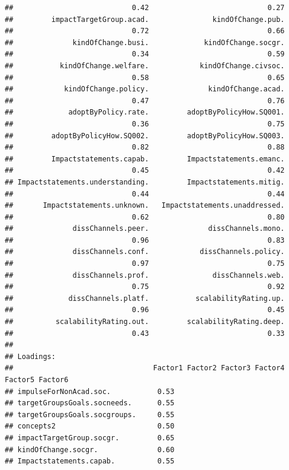 \documentclass[
]{article}
\begin{document}
\begin{verbatim}
##                            0.42                            0.27 
##         impactTargetGroup.acad.               kindOfChange.pub. 
##                            0.72                            0.66 
##              kindOfChange.busi.             kindOfChange.socgr. 
##                            0.34                            0.59 
##           kindOfChange.welfare.            kindOfChange.civsoc. 
##                            0.58                            0.65 
##            kindOfChange.policy.              kindOfChange.acad. 
##                            0.47                            0.76 
##             adoptByPolicy.rate.         adoptByPolicyHow.SQ001. 
##                            0.36                            0.75 
##         adoptByPolicyHow.SQ002.         adoptByPolicyHow.SQ003. 
##                            0.82                            0.88 
##         Impactstatements.capab.         Impactstatements.emanc. 
##                            0.45                            0.42 
## Impactstatements.understanding.         Impactstatements.mitig. 
##                            0.44                            0.44 
##       Impactstatements.unknown.   Impactstatements.unaddressed. 
##                            0.62                            0.80 
##              dissChannels.peer.              dissChannels.mono. 
##                            0.96                            0.83 
##              dissChannels.conf.            dissChannels.policy. 
##                            0.97                            0.75 
##              dissChannels.prof.               dissChannels.web. 
##                            0.75                            0.92 
##             dissChannels.platf.           scalabilityRating.up. 
##                            0.96                            0.45 
##          scalabilityRating.out.         scalabilityRating.deep. 
##                            0.43                            0.33 
## 
## Loadings:
##                                 Factor1 Factor2 Factor3 Factor4 Factor5 Factor6
## impulseForNonAcad.soc.           0.53                                          
## targetGroupsGoals.socneeds.      0.55                                          
## targetGroupsGoals.socgroups.     0.55                                          
## concepts2                        0.50                                          
## impactTargetGroup.socgr.         0.65                                          
## kindOfChange.socgr.              0.60                                          
## Impactstatements.capab.          0.55                                          

\end{verbatim}
\end{document}
